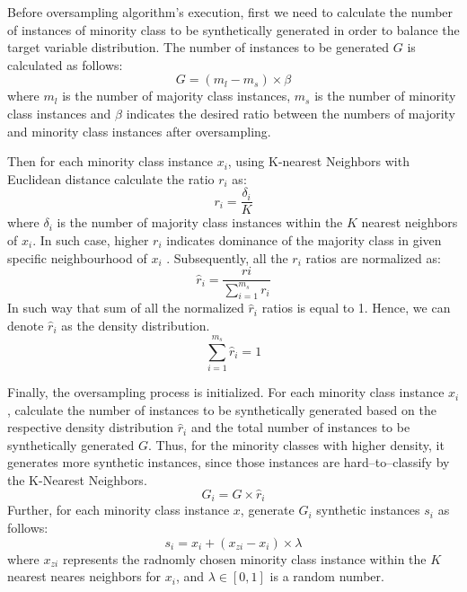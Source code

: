 Before oversampling algorithm's execution, first we need to calculate the number of instances of minority class to be synthetically generated in order to balance the target variable distribution. The number of instances to be generated $G$ is calculated as follows:
\begin{equation}\label{eq}
    G = \left(m_{l} - m_{s}\right) \times \beta
\end{equation}
where $m_l$ is the number of majority class instances, $m_s$ is the number of minority class instances and $\beta$ indicates the desired ratio between the numbers of majority and minority class instances after oversampling.

Then for each minority class instance $x_i$, using K-nearest Neighbors with Euclidean distance calculate the ratio $r_i$ as:
\begin{equation}\label{eq}
   r_{i} = \frac{\delta_{i}} {K}
\end{equation}
where $\delta_{i}$ is the number of majority class instances within the $K$ nearest neighbors of $x_i$.
In such case, higher $r_i$ indicates dominance of the majority class in given specific neighbourhood of $x_i$ \citep{nian2018introduction}.
Subsequently, all the $r_i$ ratios are normalized as:
\begin{equation}\label{eq}
    \hat{r}_{i} = \frac{r{i}}{\displaystyle\sum_{i=1}^{m_{s}} r_{i}}
\end{equation}
In such way that sum of all the normalized $\hat{r}_i$ ratios is equal to 1. Hence, we can denote $\hat{r}_i$ as the density distribution.
\begin{equation}\label{eq}
    \sum_{i=1}^{m_{s}} \hat{r}_{i} = 1
\end{equation}

Finally, the oversampling process is initialized.
For each minority class instance $x_i$, calculate the number of instances to be synthetically generated based on the respective density distribution $\hat{r}_i$ and the total number of instances to be synthetically generated $G$. Thus, for the minority classes with higher density, it generates more synthetic instances, since those instances are hard--to--classify by the K-Nearest Neighbors.
\begin{equation}\label{eq}
    G_i = G \times \hat{r}_{i}
\end{equation}
Further, for each minority class instance $x$, generate $G_i$ synthetic instances $s_i$ as follows:
\begin{equation}\label{eq}
    s_i = x_i + \left(x_{zi} - x_{i} \right) \times \lambda
\end{equation}
where $x_{zi}$ represents the radnomly chosen minority class instance within the $K$ nearest neares neighbors for $x_i$, and $\lambda \in \left[0,1\right]$ is a random number.

